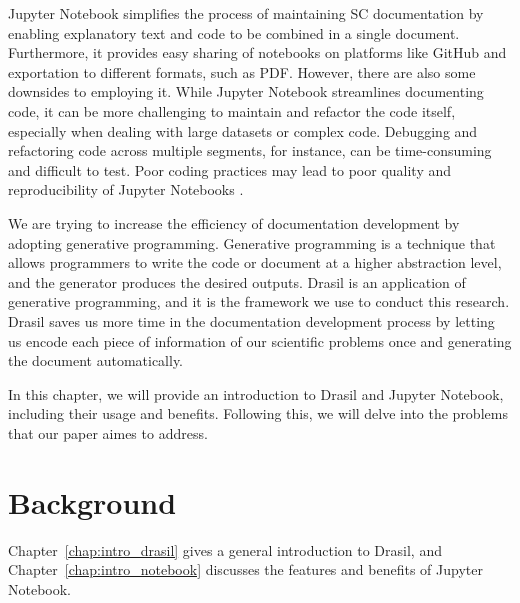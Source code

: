 Jupyter Notebook simplifies the process of maintaining SC documentation by 
enabling explanatory text and code to be combined in a single document. 
Furthermore, it provides easy sharing of notebooks on platforms like GitHub and 
exportation to different formats, such as PDF. However, there are also some 
downsides to employing it. While Jupyter Notebook streamlines documenting code, 
it can be more challenging to maintain and refactor the code itself, especially 
when dealing with large datasets or complex code. Debugging and refactoring 
code across multiple segments, for instance, can be time-consuming and 
difficult to test. Poor coding practices may lead to poor quality and 
reproducibility of Jupyter Notebooks \cite{pimentel2021understanding, 
wang2020better}.

We are trying to increase the efficiency of documentation development by 
adopting generative programming. Generative programming is a technique that 
allows programmers to write the code or document at a higher abstraction level, 
and the generator produces the desired outputs. Drasil is an application of 
generative programming, and it is the framework we use to conduct this 
research. Drasil saves us more time in the documentation development process by 
letting us encode each piece of information of our scientific problems once and 
generating the document automatically.

In this chapter, we will provide an introduction to Drasil and Jupyter 
Notebook, including their usage and benefits. Following this, we will delve 
into the problems that our paper aimes to address.

\section{Background}
Chapter~\ref{chap:intro_drasil} gives a general introduction to Drasil, and
Chapter~\ref{chap:intro_notebook} discusses the features and benefits of 
Jupyter Notebook.

